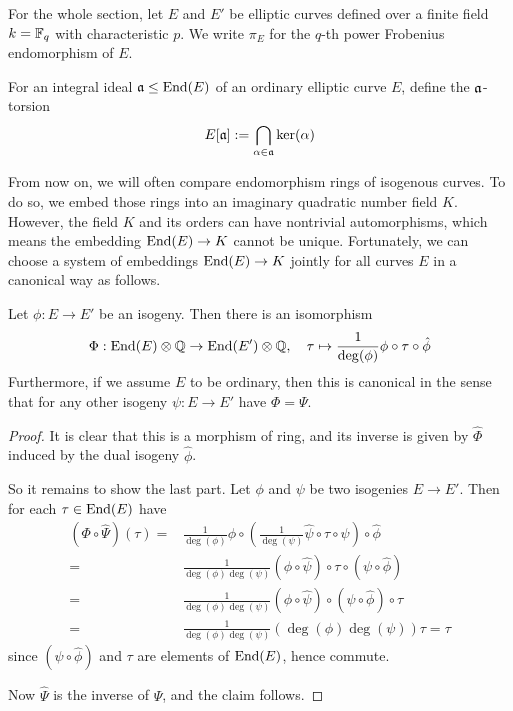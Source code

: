 For the whole section, let $E$ and $E'$ be elliptic curves defined over a finite field $k = \mathbb{F}_q$ with characteristic $p$.
We write $\pi_E$ for the $q$-th power Frobenius endomorphism of $E$.
\begin{definition}
    For an integral ideal $\mathfrak{a} \leq \mathrm{End}(E)$ of an ordinary elliptic curve $E$, define the $\mathfrak{a}$-torsion
    \begin{equation*}
        E[\mathfrak{a}] := \bigcap_{\alpha \in \mathfrak{a}} \ker(\alpha)
    \end{equation*}
\end{definition}
From now on, we will often compare endomorphism rings of isogenous curves.
To do so, we embed those rings into an imaginary quadratic number field $K$.
However, the field $K$ and its orders can have nontrivial automorphisms, which means the embedding $\mathrm{End}(E) \to K$ cannot be unique.
Fortunately, we can choose a system of embeddings $\mathrm{End}(E) \to K$ jointly for all curves $E$ in a canonical way as follows.
\begin{lemma}
    Let $\phi: E \to E'$ be an isogeny.
    Then there is an isomorphism
    \begin{equation*}
        \Phi: \mathrm{End}(E) \otimes \mathbb{Q} \to \mathrm{End}(E') \otimes \mathbb{Q}, \quad \tau \mapsto \frac 1 {\deg(\phi)} \phi \circ \tau \circ \hat{\phi}
    \end{equation*}
    Furthermore, if we assume $E$ to be ordinary, then this is canonical in the sense that for any other isogeny $\psi: E \to E'$ have $\Phi = \Psi$.
\end{lemma}
\begin{proof}
    It is clear that this is a morphism of ring, and its inverse is given by $\hat{\Phi}$ induced by the dual isogeny $\hat{\phi}$.
    
    So it remains to show the last part.
    Let $\phi$ and $\psi$ be two isogenies $E \to E'$.
    Then for each $\tau \in \mathrm{End}(E)$ have
    \begin{align*}
        (\Phi \circ \hat{\Psi})(\tau) =& \frac 1 { \deg(\phi) } \phi \circ \left( \frac 1 {\deg(\psi)} \hat{\psi} \circ \tau \circ \psi \right) \circ \hat{\phi} \\
        =& \frac 1 { \deg(\phi)\deg(\psi) } (\phi \circ \hat{\psi}) \circ \tau \circ (\psi \circ \hat{\phi}) \\
        =& \frac 1 { \deg(\phi)\deg(\psi) } (\phi \circ \hat{\psi}) \circ (\psi \circ \hat{\phi}) \circ \tau \\
        =& \frac 1 { \deg(\phi)\deg(\psi) } (\deg(\phi) \deg(\psi)) \tau = \tau
    \end{align*}
    since $(\psi \circ \hat{\phi})$ and $\tau$ are elements of $\mathrm{End}(E)$, hence commute.

    Now $\hat{\Psi}$ is the inverse of $\Psi$, and the claim follows.
\end{proof}
